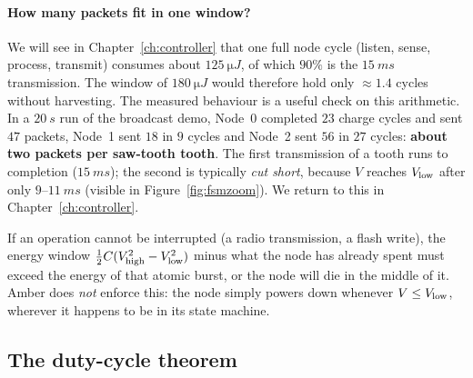 \paragraph{How many packets fit in one window?}
We will see in Chapter~\ref{ch:controller} that one full node cycle (listen, sense, process, transmit)
consumes about $\SI{125}{\micro J}$, of which $90\%$ is the $\SI{15}{ms}$
transmission. The window of $\SI{180}{\micro J}$ would therefore hold only $\approx1.4$ cycles without
harvesting. The measured behaviour is a useful check on this arithmetic. In a $\SI{20}{s}$ run of the broadcast demo, Node~0 completed
$23$ charge cycles and sent $47$ packets, Node~1 sent $18$ in $9$ cycles and Node~2 sent $56$ in $27$ cycles:
\textbf{about two packets per saw-tooth tooth}. The first transmission of a tooth runs to completion
($\SI{15}{ms}$); the second is typically \emph{cut short}, because $V$ reaches $V_{\mathrm{low}}$ after only
$9$--$\SI{11}{ms}$ (visible in Figure~\ref{fig:fsmzoom}). We return to this in Chapter~\ref{ch:controller}.

\begin{keyidea}
If an operation cannot be interrupted (a radio transmission, a flash write), the energy window
$\tfrac12C(V_{\mathrm{high}}^2-V_{\mathrm{low}}^2)$ minus what the node has already spent must exceed the energy of that atomic burst, or
the node will die in the middle of it. Amber does \emph{not} enforce this: the node simply powers
down whenever $V\le V_{\mathrm{low}}$, wherever it happens to be in its state machine.
\end{keyidea}

\subsection{The duty-cycle theorem}

